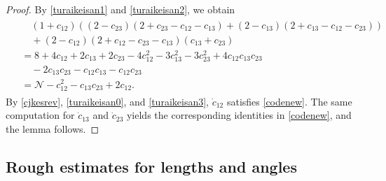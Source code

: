 \documentclass[reqno]{amsart}
\theoremstyle{plain}
\theoremstyle{definition}
\numberwithin{equation}{section}
\newcommand{\1}{\mathbbm{1}}
\begin{document}
\begin{proof}
By \eqref{turaikeisan1} and \eqref{turaikeisan2}, we obtain
\begin{align}\label{turaikeisan3}
\begin{aligned}
&\quad  (1+c_{12})\left( (2-c_{23})(2+c_{23}-c_{12}-c_{13})+(2-c_{13})(2+c_{13}-c_{12}-c_{23})\right)
\\
&\quad +(2-c_{12})(2+c_{12}-c_{23}-c_{13})(c_{13}+c_{23})
\\
&=8+4c_{12}+2c_{13}+2c_{23}-4c_{12}^2-3c_{13}^2-3c_{23}^2+4c_{12}c_{13}c_{23}
\\
&\quad-2c_{13}c_{23}-c_{12}c_{13}-c_{12}c_{23}
\\
&=\mathcal{N}-c_{12}^2-c_{13}c_{23}+2c_{12}.
\end{aligned}
\end{align}
By \eqref{cjkesrev}, \eqref{turaikeisan0}, and \eqref{turaikeisan3}, $\dot{c}_{12}$ satisfies \eqref{codenew}.
The same computation for $\dot{c}_{13}$ and $\dot{c}_{23}$ yields the corresponding identities in \eqref{codenew}, and the lemma follows.
\end{proof}

\subsection{Rough estimates for lengths and angles}
\end{document}
